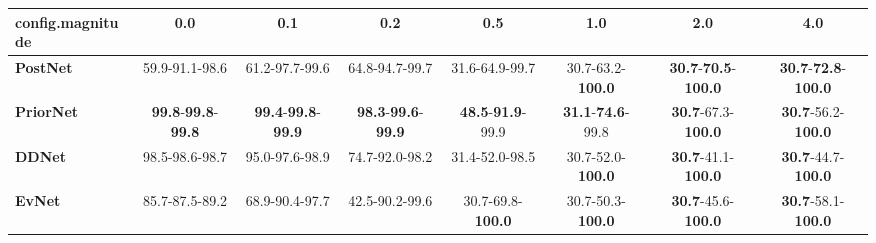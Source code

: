 \begin{tabular}{lccccccc}
\toprule
\textbf{config.magnitude} &                                        0.0 &                                        0.1 &                                        0.2 &                               0.5 &                               1.0 &                                         2.0 &                                         4.0 \\
\midrule
\textbf{PostNet } &                             59.9-91.1-98.6 &                             61.2-97.7-99.6 &                             64.8-94.7-99.7 &                    31.6-64.9-99.7 &          30.7-63.2-\textbf{100.0} &  \textbf{30.7}-\textbf{70.5}-\textbf{100.0} &  \textbf{30.7}-\textbf{72.8}-\textbf{100.0} \\
\textbf{PriorNet} &  \textbf{99.8}-\textbf{99.8}-\textbf{99.8} &  \textbf{99.4}-\textbf{99.8}-\textbf{99.9} &  \textbf{98.3}-\textbf{99.6}-\textbf{99.9} &  \textbf{48.5}-\textbf{91.9}-99.9 &  \textbf{31.1}-\textbf{74.6}-99.8 &           \textbf{30.7}-67.3-\textbf{100.0} &           \textbf{30.7}-56.2-\textbf{100.0} \\
\textbf{DDNet   } &                             98.5-98.6-98.7 &                             95.0-97.6-98.9 &                             74.7-92.0-98.2 &                    31.4-52.0-98.5 &          30.7-52.0-\textbf{100.0} &           \textbf{30.7}-41.1-\textbf{100.0} &           \textbf{30.7}-44.7-\textbf{100.0} \\
\textbf{EvNet   } &                             85.7-87.5-89.2 &                             68.9-90.4-97.7 &                             42.5-90.2-99.6 &          30.7-69.8-\textbf{100.0} &          30.7-50.3-\textbf{100.0} &           \textbf{30.7}-45.6-\textbf{100.0} &           \textbf{30.7}-58.1-\textbf{100.0} \\
\bottomrule
\end{tabular}
